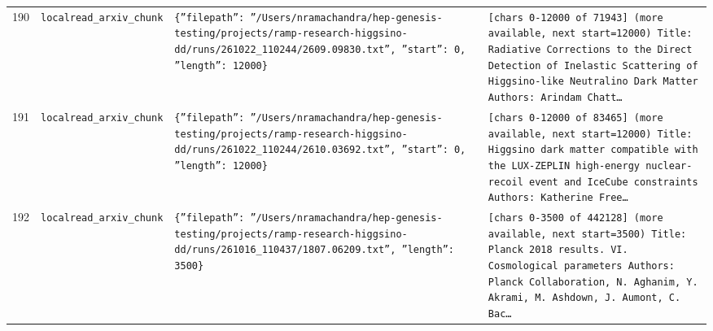 \documentclass[11pt,a4paper]{article}
\begin{document}
\begin{longtable}{@{}p{}p{}p{}p{}@{}}
190 & \texttt{local}\newline\texttt{read\_\allowbreak{}arxiv\_\allowbreak{}chunk} & \texttt{\{''filepath'':\allowbreak{} ''/\allowbreak{}Users/\allowbreak{}nramachandra/\allowbreak{}hep-genesis-testing/\allowbreak{}projects/\allowbreak{}ramp-research-higgsino-dd/\allowbreak{}runs/\allowbreak{}261022\_\allowbreak{}110244/\allowbreak{}2609.09830.txt'',\allowbreak{} ''start'':\allowbreak{} 0,\allowbreak{} ''length'':\allowbreak{} 12000\}\allowbreak{}} & \texttt{[chars 0-12000 of 71943]\allowbreak{} (more available,\allowbreak{} next start=\allowbreak{}12000)\allowbreak{}  Title:\allowbreak{} Radiative Corrections to the Direct Detection of Inelastic Scattering of Higgsino-like Neutralino Dark Matter Authors:\allowbreak{} Arindam Chatt\ldots{}\allowbreak{}} \\
191 & \texttt{local}\newline\texttt{read\_\allowbreak{}arxiv\_\allowbreak{}chunk} & \texttt{\{''filepath'':\allowbreak{} ''/\allowbreak{}Users/\allowbreak{}nramachandra/\allowbreak{}hep-genesis-testing/\allowbreak{}projects/\allowbreak{}ramp-research-higgsino-dd/\allowbreak{}runs/\allowbreak{}261022\_\allowbreak{}110244/\allowbreak{}2610.03692.txt'',\allowbreak{} ''start'':\allowbreak{} 0,\allowbreak{} ''length'':\allowbreak{} 12000\}\allowbreak{}} & \texttt{[chars 0-12000 of 83465]\allowbreak{} (more available,\allowbreak{} next start=\allowbreak{}12000)\allowbreak{}  Title:\allowbreak{} Higgsino dark matter compatible with the LUX-ZEPLIN high-energy nuclear-recoil event and IceCube constraints Authors:\allowbreak{} Katherine Free\ldots{}\allowbreak{}} \\
192 & \texttt{local}\newline\texttt{read\_\allowbreak{}arxiv\_\allowbreak{}chunk} & \texttt{\{''filepath'':\allowbreak{} ''/\allowbreak{}Users/\allowbreak{}nramachandra/\allowbreak{}hep-genesis-testing/\allowbreak{}projects/\allowbreak{}ramp-research-higgsino-dd/\allowbreak{}runs/\allowbreak{}261016\_\allowbreak{}110437/\allowbreak{}1807.06209.txt'',\allowbreak{} ''length'':\allowbreak{} 3500\}\allowbreak{}} & \texttt{[chars 0-3500 of 442128]\allowbreak{} (more available,\allowbreak{} next start=\allowbreak{}3500)\allowbreak{}  Title:\allowbreak{} Planck 2018 results. VI. Cosmological parameters Authors:\allowbreak{}  Planck Collaboration,\allowbreak{} N. Aghanim,\allowbreak{} Y. Akrami,\allowbreak{} M. Ashdown,\allowbreak{} J. Aumont,\allowbreak{} C. Bac\ldots{}\allowbreak{}} \\

\end{longtable}
\end{document}
